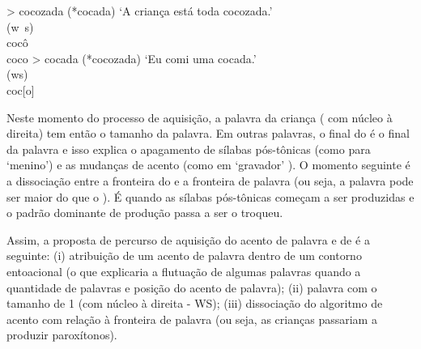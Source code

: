 \documentclass[output=paper]{LSP/langsci}
\begin{document}
\ea\label{ex:santana_31}
\ea\label{ex:santana_31a}
 > cocozada (*cocada) `A criança está toda cocozada.'\\
{(w~s)}\\
cocô\\
\ex\label{ex:santana_31b}
\glll coco > cocada (*cocozada) `Eu comi uma cocada.'\\
{(ws)}\\
coc[o]\\
\zl

Neste momento do processo de aquisição, a palavra da criança ( com núcleo à direita) tem então o tamanho da palavra. Em outras palavras, o final do  é o final da palavra e isso explica o apagamento de sílabas pós-tônicas (como \ipa{[mi\pstr ni]} para `menino') e as mudanças de acento (como em `gravador' \ipa{[ga.va\pstr do]}). O momento seguinte é a dissociação entre a fronteira do  e a fronteira de palavra (ou seja, a palavra pode ser maior do que o ). É quando as sílabas pós-tônicas começam a ser produzidas e o padrão dominante de produção passa a ser o troqueu.

Assim, a proposta de percurso de aquisição do acento de palavra e de  é a seguinte: (i) atribuição de um acento de palavra dentro de um contorno entoacional (o que explicaria a flutuação de algumas palavras quando a quantidade de palavras e posição do acento de palavra); (ii) palavra com o tamanho de 1  (com núcleo à direita - WS); (iii) dissociação do algoritmo de acento com relação à fronteira de palavra (ou seja, as crianças passariam a produzir paroxítonos).


{\sloppy
\printbibliography[heading=subbibliography,notkeyword=this]
}
\end{document}
